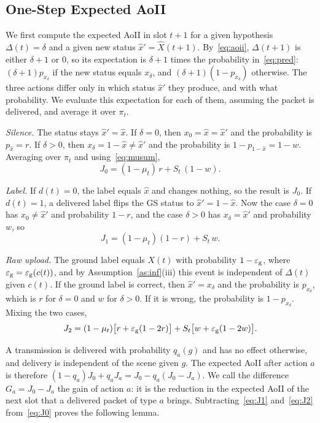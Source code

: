 \documentclass[5p,twocolumn]{elsarticle}
\theoremstyle{remark}
\newcommand{\ee}{\varepsilon}
\newcommand{\xh}{\hat{x}}
\begin{document}
\subsection{One-Step Expected AoII}
We first compute the expected AoII in slot $t+1$ for a given hypothesis $\Delta(t)=\delta$ and a given new status $\xh'=\hat X(t+1)$. By~\eqref{eq:aoii}, $\Delta(t+1)$ is either $\delta+1$ or $0$, so its expectation is $\delta+1$ times the probability in~\eqref{eq:pred}: $(\delta+1)p_{x_\delta}$ if the new status equals $x_\delta$, and $(\delta+1)(1-p_{x_\delta})$ otherwise. The three actions differ only in which status $\xh'$ they produce, and with what probability. We evaluate this expectation for each of them, assuming the packet is delivered, and average it over $\pi_t$.

\emph{Silence.} The status stays $\xh'=\xh$. If $\delta=0$, then $x_0=\xh=\xh'$ and the probability is $p_{\xh}=r$. If $\delta>0$, then $x_\delta=1-\xh\neq\xh'$ and the probability is $1-p_{1-\xh}=1-w$. Averaging over $\pi_t$ and using~\eqref{eq:musum},
\begin{equation}\label{eq:J0}
J_0=(1-\mu_t)\,r+S_t\,(1-w).
\end{equation}

\emph{Label.} If $d(t)=0$, the label equals $\xh$ and changes nothing, so the result is $J_0$. If $d(t)=1$, a delivered label flips the GS status to $\xh'=1-\xh$. Now the case $\delta=0$ has $x_0\neq\xh'$ and probability $1-r$, and the case $\delta>0$ has $x_\delta=\xh'$ and probability $w$, so
\begin{equation}\label{eq:J1}
J_1=(1-\mu_t)(1-r)+S_t\,w.
\end{equation}

\emph{Raw upload.} The ground label equals $X(t)$ with probability $1-\ee_{\rm g}$, where $\ee_{\rm g}=\ee_{\rm g}(c(t))$, and by Assumption~\ref{as:inf}(iii) this event is independent of $\Delta(t)$ given $c(t)$. If the ground label is correct, then $\xh'=x_\delta$ and the probability is $p_{x_\delta}$, which is $r$ for $\delta=0$ and $w$ for $\delta>0$. If it is wrong, the probability is $1-p_{x_\delta}$. Mixing the two cases,
\begin{equation}\label{eq:J2}
J_2=(1-\mu_t)\big[r+\ee_{\rm g}(1-2r)\big]+S_t\big[w+\ee_{\rm g}(1-2w)\big].
\end{equation}

A transmission is delivered with probability $q_a(g)$ and has no effect otherwise, and delivery is independent of the scene given $g$. The expected AoII after action $a$ is therefore $(1-q_a)J_0+q_aJ_a=J_0-q_a(J_0-J_a)$. We call the difference $G_a=J_0-J_a$ the gain of action $a$: it is the reduction in the expected AoII of the next slot that a delivered packet of type $a$ brings. Subtracting~\eqref{eq:J1} and~\eqref{eq:J2} from~\eqref{eq:J0} proves the following lemma.
\end{document}
